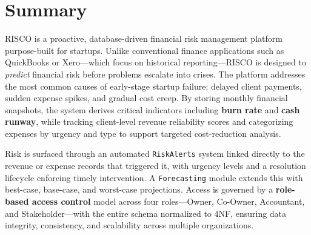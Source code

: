 \documentclass[12pt,a4paper]{article}
\begin{document}
\section{Summary}

RISCO is a proactive, database-driven financial risk management platform
purpose-built for startups. Unlike conventional finance applications such as
QuickBooks or Xero---which focus on historical reporting---RISCO is designed
to \emph{predict} financial risk before problems escalate into crises. The
platform addresses the most common causes of early-stage startup failure:
delayed client payments, sudden expense spikes, and gradual cost creep. By
storing monthly financial snapshots, the system derives critical indicators
including \textbf{burn rate} and \textbf{cash runway}, while tracking
client-level revenue reliability scores and categorizing expenses by urgency
and type to support targeted cost-reduction analysis.

Risk is surfaced through an automated \texttt{RiskAlerts} system linked
directly to the revenue or expense records that triggered it, with urgency
levels and a resolution lifecycle enforcing timely intervention. A
\texttt{Forecasting} module extends this with best-case, base-case, and
worst-case projections. Access is governed by a \textbf{role-based access
control} model across four roles---Owner, Co-Owner, Accountant, and
Stakeholder---with the entire schema normalized to 4NF, ensuring data
integrity, consistency, and scalability across multiple organizations.
\end{document}
